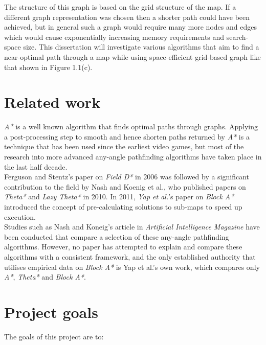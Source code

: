 \documentclass[12pt,notitlepage]{report}
\begin{document}
\noindent
The structure of this graph is based on the grid structure of the map. If a different graph representation was chosen then a shorter path could have been achieved, but in general such a graph would require many more nodes and edges which would cause exponentially increasing memory requirements and search-space size. This dissertation will investigate various algorithms that aim to find a near-optimal path through a map while using space-efficient grid-based graph like that shown in Figure 1.1(c).\\

\section{Related work}

{\em A*} is a well known algorithm that finds optimal paths through graphs. Applying a post-processing step to smooth and hence shorten paths returned by {\em A*} is a technique that has been used since the earliest video games\cite{Thorpe84}, but most of the research into more advanced any-angle pathfinding algorithms have taken place in the last half decade. \\

\noindent
Ferguson and Stentz's paper on {\em Field D*}\cite{FergusonStentz06} in 2006 was followed by a significant contribution to the field by Nash and Koenig et al., who published papers on {\em Theta*}\cite{Daniel10} and {\em Lazy Theta*}\cite{Nash10} in 2010. In 2011, {\em Yap et al.}'s paper on {\em Block A*}\cite{Yap11} introduced the concept of pre-calculating solutions to sub-maps to speed up execution.\\

\noindent
Studies such as Nash and Koneig's article in {\em Artificial Intelligence Magazine}\cite{Nash13} have been conducted that compare a selection of these any-angle pathfinding algorithms. However, no paper has attempted to explain and compare these algorithms with a consistent framework, and the only established authority that utilises empirical data on {\em Block A*} is Yap et al.'s own work\cite{Yap11}\cite{Yap11_2}, which compares only {\em A*}, {\em Theta*} and {\em Block A*}.

\section {Project goals}

\noindent
The goals of this project are to:
\end{document}
